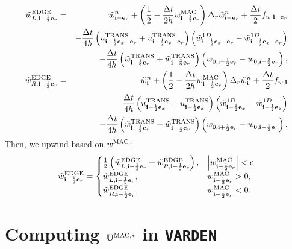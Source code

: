 \documentclass[11pt]{article}
\def\half  {\frac{1}{2}}
\def\dt    {\Delta t}
\def\edge  {\rm EDGE}
\def\mac   {\rm MAC}
\def\trans {\rm TRANS}
\def\eb    {{\bf e}}
\def\ib    {{\bf i}}
\def\Ub    {{\bf U}}
\def\wt    {\tilde{w}}
\begin{document}
\begin{eqnarray}
\wt_{L,\ib-\half\eb_r}^{\edge} &=& \wt_{\ib-\eb_r}^n + \left(\half - \frac{\dt}{2h}w_{\ib-\half\eb_r}^{\mac}\right)\Delta_r \wt_{\ib-\eb_r}^n + \frac{\dt}{2}f_{w,\ib-\eb_r} \nonumber \\
&& - \frac{\dt}{4h}\left(u_{\ib+\half\eb_x-\eb_r}^{\trans}+u_{\ib-\half\eb_x-\eb_r}^{\trans}\right)\left(\wt_{\ib+\half\eb_x-\eb_r}^{1D} - \wt_{\ib-\half\eb_x-\eb_r}^{1D}\right) \nonumber \\
&& -
\frac{\dt}{4h}\left(\wt_{\ib-\half\eb_r}^{\trans}+\wt_{\ib-\frac{3}{2}\eb_r}^{\trans}\right)\left(w_{0,\ib-\half\eb_r}-w_{0,\ib-\frac{3}{2}\eb_r}\right), \label{wt_L r-edge} \\
\wt_{R,\ib-\half\eb_r}^{\edge} &=& \wt_{\ib}^n + \left(\half - \frac{\dt}{2h}w_{\ib-\half\eb_r}^{\mac}\right)\Delta_r \wt_{\ib}^n + \frac{\dt}{2}f_{w,\ib} \nonumber \\
&& - \frac{\dt}{4h}\left(u_{\ib+\half\eb_x}^{\trans}+u_{\ib-\half\eb_x}^{\trans}\right)\left(\wt_{\ib+\half\eb_x}^{1D} - \wt_{\ib-\half\eb_x}^{1D}\right) \nonumber \\
&& -
\frac{\dt}{4h}\left(\wt_{\ib+\half\eb_r}^{\trans}+\wt_{\ib-\half\eb_r}^{\trans}\right)\left(w_{0,\ib+\half\eb_r}-w_{0,\ib-\half\eb_r}\right). \label{wt_R r-edge}
\end{eqnarray}
Then, we upwind based on $w^{\mac}$:
\begin{equation}
\wt_{\ib-\half\eb_r}^{\edge} =
\begin{cases}
\half\left(\wt_{L,\ib-\half\eb_r}^{\edge} + \wt_{R,\ib-\half\eb_r}^{\edge}\right), & \left|w^{\mac}_{\ib-\half\eb_r}\right| < \epsilon \\
\wt_{L,\ib-\half\eb_r}^{\edge}, & w^{\mac}_{\ib-\half\eb_r} > 0, \\
\wt_{R,\ib-\half\eb_r}^{\edge}, & w^{\mac}_{\ib-\half\eb_r} < 0.
\end{cases}
\end{equation}
\cleardoublepage
\section{Computing $\Ub^{\mac,*}$ in {\tt VARDEN}}
\end{document}
